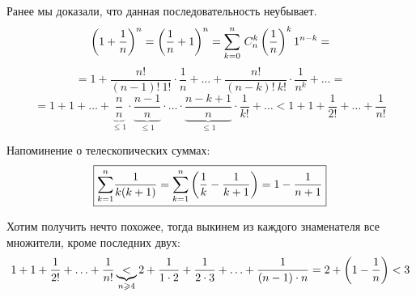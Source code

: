 \begin{Proof}
    Ранее мы доказали, что данная последовательность неубывает.
    $$ \l(1 + \frac{1}{n}\r)^n = \l(\frac{1}{n} + 1\r)^n = \Sum{k = 0}{n} \ C^k_n \l(\frac{1}{n}\r)^k 1^{n-k} =$$
    $$ = 1 + \frac{n!}{(n-1)!\ 1!} \cdot \frac{1}{n} + \ldots + \frac{n!}{(n-k)!\ k!} \cdot \frac{1}{n^k} + \ldots = $$
    $$ = 1 + 1 + \ldots + \underbrace{\frac{n}{n}}_{\leq 1} \cdot \underbrace{\frac{n-1}{n}}_{\leq 1} \cdot \ldots \cdot \underbrace{\frac{n - k + 1}{n}}_{\leq 1} \cdot \frac{1}{k!} + \ldots < 1 + 1 + \frac{1}{2!} + \ldots + \frac{1}{n!} $$

    Напоминение о телескопических суммах:
    $$
    \boxed{
    \begin{aligned}
        \Sum{k=1}{n} \frac{1}{k(k+1)} = \Sum{k=1}{n} \l(\frac{1}{k} - \frac{1}{k+1} \r) = 1 - \frac{1}{n+1}
    \end{aligned}
    }$$

    Хотим получить нечто похожее, тогда выкинем из каждого знаменателя все множители, кроме последних двух:
    $$ 1 + 1 + \frac{1}{2!} + \ldots + \frac{1}{n!} \underbrace{<}_{n \geq 4} 2 + \frac{1}{1 \cdot 2} + \frac{1}{2 \cdot 3} + \ldots + \frac{1}{(n - 1) \cdot n} = 2 + \l(1 - \frac{1}{n} \r) < 3 $$
\end{Proof}
